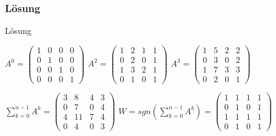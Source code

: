 \documentclass{beamer}
\begin{document}
\begin{frame}
	\frametitle{L\"osung}
	\begin{block}{L\"osung}
	
	
	$A^0 = \begin{pmatrix}
				 1 & 0 & 0 & 0\\
				 0 & 1 & 0 & 0\\
				 0 & 0 & 1 & 0\\
				 0 & 0 & 0 & 1
			\end{pmatrix}$
	$A^2 = \begin{pmatrix}
				 1 & 2 & 1 & 1\\
				 0 & 2 & 0 & 1\\
				 1 & 3 & 2 & 1\\
				 0 & 1 & 0 & 1
			\end{pmatrix}$
	$A^3 = \begin{pmatrix}
				 1 & 5 & 2 & 2\\
				 0 & 3 & 0 & 2\\
				 1 & 7 & 3 & 3\\
				 0 & 2 & 0 & 1
			\end{pmatrix}$  

	$\sum_{k=0}^{n-1} A^k = 
			\begin{pmatrix}
				 3 & 8 & 4 & 3\\
				 0 & 7 & 0 & 4\\
				 4 & 11 & 7 & 4\\
				 0 & 4 & 0 & 3
			\end{pmatrix}$
	$W = sgn(\sum_{k=0}^{n-1} A^k) =
			\begin{pmatrix}
				 1 & 1 & 1 & 1\\
				 0 & 1 & 0 & 1\\
				 1 & 1 & 1 & 1\\
				 0 & 1 & 0 & 1
			\end{pmatrix}$

	\end{block}	
\end{frame}
\end{document}
